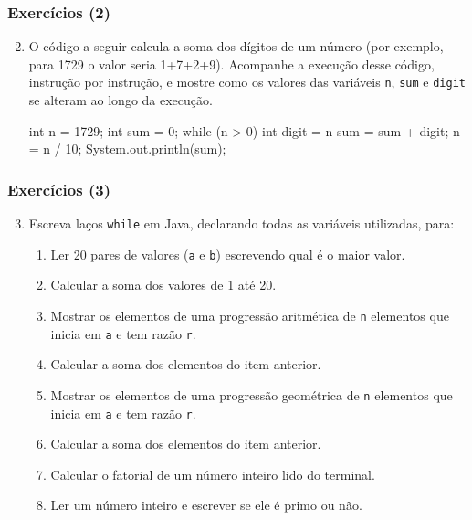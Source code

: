 \documentclass[xcolor={dvipsnames,table},aspectratio=169]{beamer}
\begin{document}
\begin{frame}[fragile]\frametitle{Exercícios (2)}
\begin{enumerate}
	\setcounter{enumi}{1}
	\item O código a seguir calcula a soma dos dígitos de um número (por exemplo, para 1729 o valor seria 1+7+2+9). Acompanhe a 	execução desse código, instrução por instrução, e mostre como os valores das variáveis \texttt{n}, \texttt{sum} e \texttt{digit} se alteram ao longo da execução.
\begin{javacode}
int n = 1729;
int sum = 0;
while (n > 0) {
   int digit = n %
   sum = sum + digit;
   n = n / 10;
}
System.out.println(sum);
\end{javacode}
\end{enumerate}
\end{frame}
	
\begin{frame}\frametitle{Exercícios (3)}
\begin{enumerate}
	\setcounter{enumi}{2}
	\item Escreva laços \texttt{while} em Java, declarando todas as variáveis utilizadas, para:
	\begin{enumerate}[a]
		\item Ler 20 pares de valores (\texttt{a} e \texttt{b}) escrevendo qual é o maior valor.
		\item Calcular a soma dos valores de 1 até 20.
		\item Mostrar os elementos de uma progressão aritmética de \texttt{n} elementos que inicia em \texttt{a} e tem razão \texttt{r}.
		\item Calcular a soma dos elementos do item anterior.
		\item Mostrar os elementos de uma progressão geométrica de \texttt{n} elementos que inicia em \texttt{a} e tem razão \texttt{r}.
		\item Calcular a soma dos elementos do item anterior.
		\item Calcular o fatorial de um número inteiro lido do terminal.
		\item Ler um número inteiro e escrever se ele é primo ou não.
	\end{enumerate}
\end{enumerate}
\end{frame}
\end{document}
